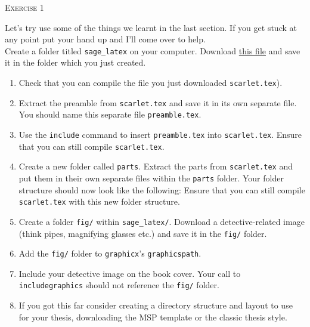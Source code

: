\documentclass{article}
\begin{document}
\begin{center}
  \Large\textsc{Exercise 1}
\end{center}

Let's try use some of the things we learnt in the last section. If you
get stuck at any point put your hand up and I'll come over to help.\\

Create a folder titled \texttt{sage\_latex} on your computer. Download
\href{https://jwalton.info/assets/teaching/latex/scarlet.tex}{this file} 
and save it in the folder which you just created.

\begin{enumerate}
  \item Check that you can compile the file you just downloaded
    \texttt{scarlet.tex}).

  \item Extract the preamble from \texttt{scarlet.tex} and save it in its own
	  separate file. You should name this separate file
	  \texttt{preamble.tex}.

  \item Use the \texttt{\tb include} command to insert
	  \texttt{preamble.tex} into \texttt{scarlet.tex}. Ensure that you can
	  still compile \texttt{scarlet.tex}.

  \item{Create a new folder called \texttt{parts}. Extract the parts from 
	  \texttt{scarlet.tex} and put them in their own separate files within
	  the \texttt{parts} folder. Your folder structure should now look
	  like the following:
	  \vspace{0.25cm}
	  Ensure that you can still compile \texttt{scarlet.tex} with this new 
    folder structure.}

  \item Create a folder \texttt{fig/} within \texttt{sage\_latex/}. Download a
	  detective-related image (think pipes, magnifying glasses etc.) and
	  save it in the \texttt{fig/} folder.

  \item Add the \texttt{fig/} folder to \texttt{graphicx}'s
	  \texttt{graphicspath}.

  \item Include your detective image on the book cover. Your call to
	  \texttt{\tb includegraphics} should not reference the
    \texttt{fig/} folder.
	  
  \item If you got this far consider creating a directory structure and layout
	  to use for your thesis, downloading the MSP template or the classic
	  thesis style.
\end{enumerate}
\end{document}
